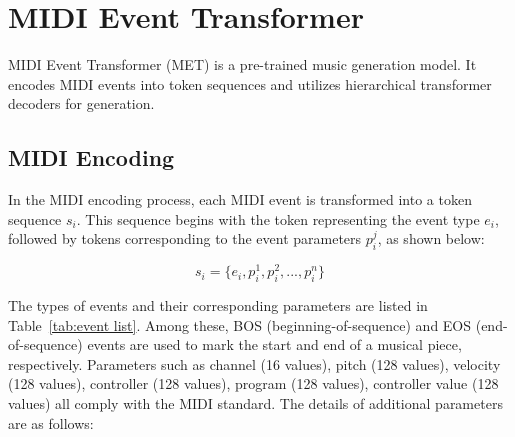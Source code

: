 
\maketitle

\appendix

\section{MIDI Event Transformer}

MIDI Event Transformer (MET) is a pre-trained music generation model. It encodes MIDI events into token sequences and utilizes hierarchical transformer decoders for generation. 

\subsection{MIDI Encoding}

In the MIDI encoding process, each MIDI event is transformed into a token sequence $s_i$. This sequence begins with the token representing the event type $e_i$, followed by tokens corresponding to the event parameters $p_i^j$, as shown below:

\begin{equation}
s_i = \{e_i, p_i^1, p_i^2, ..., p_i^n\}
\end{equation}

The types of events and their corresponding parameters are listed in Table~\ref{tab:event list}. Among these, BOS (beginning-of-sequence) and EOS (end-of-sequence) events are used to mark the start and end of a musical piece, respectively. Parameters such as channel (16 values), pitch (128 values), velocity (128 values), controller (128 values), program (128 values), controller value (128 values) all comply with the MIDI standard.  The details of additional parameters are as follows:

